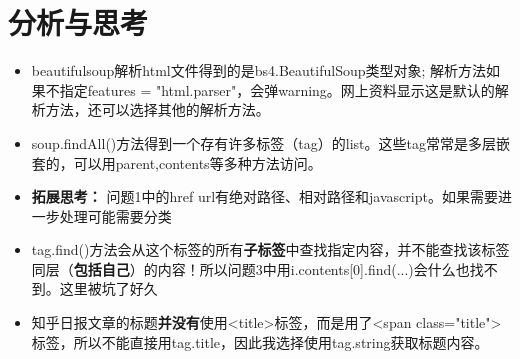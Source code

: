 \documentclass[12pt,a4paper]{article}
\begin{document}
\section{分析与思考}
\begin{itemize}
	\item beautifulsoup解析html文件得到的是bs4.BeautifulSoup类型对象; 解析方法如果不指定features = "html.parser"，会弹warning。网上资料显示这是默认的解析方法，还可以选择其他的解析方法。
	\item soup.findAll()方法得到一个存有许多标签（tag）的list。这些tag常常是多层嵌套的，可以用parent,contents等多种方法访问。
	\item \textbf{拓展思考：} 问题1中的href url有绝对路径、相对路径和javascript。如果需要进一步处理可能需要分类
	\item tag.find()方法会从这个标签的所有\textbf{子标签}中查找指定内容，并不能查找该标签同层（\textbf{包括自己}）的内容！所以问题3中用i.contents[0].find(...)会什么也找不到。这里被坑了好久
	\item 知乎日报文章的标题\textbf{并没有}使用<title>标签，而是用了<span class="title">标签，所以不能直接用tag.title，因此我选择使用tag.string获取标题内容。
\end{itemize}
\end{document}
